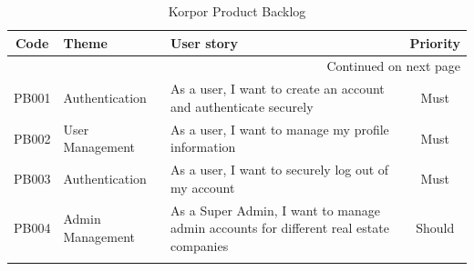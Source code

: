\begin{longtable}{|c|l|p{8cm}|c|}
    \caption{Korpor Product Backlog\label{tab:product-backlog}} \\
    \hline
    \textbf{Code} & \textbf{Theme} & \textbf{User story} & \textbf{Priority} \\
    \hline
    \endfirsthead
    
    \hline
    \endhead
    
    \hline \multicolumn{4}{|r|}{{Continued on next page}} \\ \hline
    \endfoot
    
    \hline
    \endlastfoot
    
    PB001 & Authentication & As a user, I want to create an account and authenticate securely & Must \\
    \hline
    PB002 & User Management & As a user, I want to manage my profile information & Must \\
    \hline
    PB003 & Authentication & As a user, I want to securely log out of my account & Must \\
    \hline
    PB004 & Admin Management & As a Super Admin, I want to manage admin accounts for different real estate companies & Should \\
    
    \newpage
    

\end{longtable}
